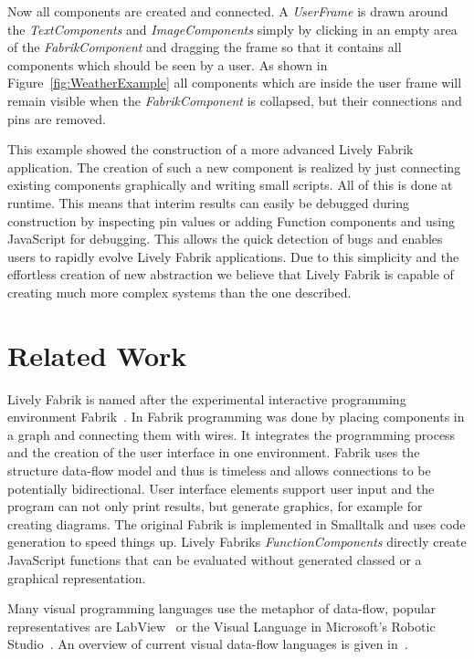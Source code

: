\documentclass[pdftex, times, 10pt, twocolumn]{article}
\begin{document}
Now all components are created and connected. A {\em UserFrame} is drawn around the {\em TextComponents} and  {\em ImageComponents} simply by clicking in an empty area of the {\em FabrikComponent} and dragging the frame so that it contains all components which should be seen by a user. As shown in Figure~\ref{fig:WeatherExample} all components which are inside the user frame will remain visible when the {\em FabrikComponent} is collapsed, but their connections and pins are removed. 

This example showed the construction of a more advanced Lively Fabrik application. The creation of such a new component is realized by just connecting existing components graphically and writing small scripts. All of this is done at runtime. This means that interim results can easily be debugged during construction by inspecting pin values or adding Function components and using JavaScript for debugging. This allows the quick detection of bugs and enables users to rapidly evolve Lively Fabrik applications. Due to this simplicity and the effortless creation of new abstraction we believe that Lively Fabrik is capable of creating much more complex systems than the one described. 



\section{Related Work}
Lively Fabrik is named after the experimental interactive programming environment Fabrik~\cite{Ingalls1988FVP,Ludolph1988FPE}. In Fabrik programming was done by placing components in a graph and connecting them with wires. It integrates the programming process and the creation of the user interface in one environment. Fabrik uses the structure data-flow model and thus is timeless and allows connections to be potentially bidirectional. User interface elements support user input and the program can not only print results, but generate graphics, for example for creating diagrams. The original Fabrik is implemented in Smalltalk and uses code generation to speed things up. Lively Fabriks {\em FunctionComponents} directly create JavaScript functions that can be evaluated without generated classed or a graphical representation.  

Many visual programming languages use the metaphor of data-flow, popular representatives are LabView~\cite{Bitter2006LAP} or the Visual Language in Microsoft's Robotic Studio~\cite{Morgan2008PMR}. An overview of current visual data-flow languages is given in~\cite{Johnston2004ADP}. 
\end{document}
